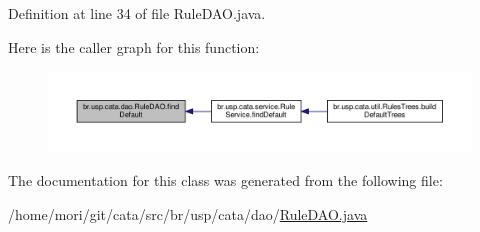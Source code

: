 Definition at line 34 of file Rule\+D\+A\+O.\+java.



Here is the caller graph for this function\+:\nopagebreak
\begin{figure}[H]
\begin{center}
\leavevmode
\includegraphics[width=350pt]{classbr_1_1usp_1_1cata_1_1dao_1_1_rule_d_a_o_a00d2a2b86e3c826cdccf4776ba9996c7_icgraph}
\end{center}
\end{figure}




The documentation for this class was generated from the following file\+:\begin{DoxyCompactItemize}
\item 
/home/mori/git/cata/src/br/usp/cata/dao/\hyperlink{_rule_d_a_o_8java}{Rule\+D\+A\+O.\+java}\end{DoxyCompactItemize}
